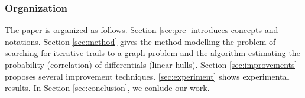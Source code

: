 \begin{enumerate}
\end{enumerate}

\subsubsection{Organization}
The paper is organized as follows. Section \ref{sec:pre} introduces concepts and notations. Section \ref{sec:method} gives the method modelling the problem of searching for iterative trails to a graph problem and the algorithm estimating the probability (correlation) of differentials (linear hulls). Section \ref{sec:improvements} proposes several improvement techniques. \ref{sec:experiment} shows experimental results. In Section \ref{sec:conclusion}, we conlude our work.
